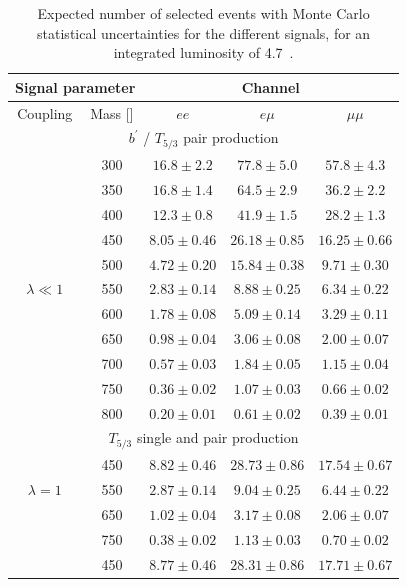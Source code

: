 \begin{table}[p]
\begin{center}
    \caption{Expected number of selected events with Monte Carlo statistical uncertainties 
      for the different signals, for an integrated luminosity of 4.7~\ifb{}.}\label{yieldsignal}
    \begin{tabular}{c|c|c|c|c}
      \hline\hline
      \multicolumn{2}{c|}{Signal parameter}  & \multicolumn{3}{c}{Channel} \\
      \hline
      Coupling& Mass [\GeV{}]      & $ee$ & $e\mu$ & $\mu\mu$ \\ 
      \hline
       \multicolumn{5}{c}{$b^\prime$ / $T_{5/3}$ pair production} \\
      \hline
      & 300 & $16.8 \pm 2.2$   & $77.8 \pm 5.0$   & $57.8 \pm 4.3$     \\ 
      & 350 & $16.8 \pm 1.4$   & $64.5 \pm 2.9$   & $36.2 \pm 2.2$     \\ 
      & 400 & $12.3 \pm 0.8$   & $41.9 \pm 1.5$   & $28.2 \pm 1.3$     \\ 
      & 450 & $8.05 \pm 0.46$   & $26.18 \pm 0.85$   & $16.25 \pm 0.66$     \\ 
      & 500 & $4.72 \pm 0.20$   & $15.84 \pm 0.38$   & $9.71 \pm 0.30$     \\ 
      $\lambda\ll1$ & 550 & $2.83 \pm 0.14$   & $8.88 \pm 0.25$   & $6.34 \pm 0.22$     \\ 
      & 600 & $1.78 \pm 0.08$   & $5.09 \pm 0.14$   & $3.29 \pm 0.11$     \\ 
      & 650 & $0.98 \pm 0.04$   & $3.06 \pm 0.08$   & $2.00 \pm 0.07$     \\ 
      & 700 & $0.57 \pm 0.03$   & $1.84 \pm 0.05$   & $1.15 \pm 0.04$     \\ 
      & 750 & $0.36 \pm 0.02$   & $1.07 \pm 0.03$   & $0.66 \pm 0.02$     \\ 
      & 800 & $0.20 \pm 0.01$   & $0.61 \pm 0.02$   & $0.39 \pm 0.01$     \\ 
      \hline
      \multicolumn{5}{c}{$T_{5/3}$ single and pair production} \\
      \hline
      & 450 & $8.82 \pm 0.46$ & $28.73 \pm 0.86$ & $17.54 \pm 0.67$ \\
      $\lambda=1$ & 550 & $2.87 \pm 0.14$ & $9.04  \pm 0.25$ & $6.44  \pm 0.22$ \\
      & 650 & $1.02 \pm 0.04$ & $3.17  \pm 0.08$ & $2.06  \pm 0.07$ \\
      & 750 & $0.38 \pm 0.02$ & $1.13  \pm 0.03$ & $0.70  \pm 0.02$ \\
      \hline
      & 450 & $8.77 \pm 0.46$ & $28.31 \pm 0.86$ & $17.71 \pm 0.67$ \\

\end{tabular}
\end{center}
\end{table}
